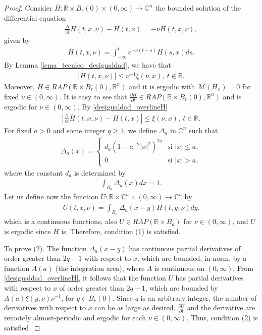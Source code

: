 \documentclass[10pt,a4paper]{amsart}
\newcommand{\bb}[1]{{\mathbb{#1}}}
\begin{document}
\begin{proof}
Consider $\overline{H}:\bb{R}\times B_{r}(0) \times (0,\infty)\rightarrow\bb{C}^n$ the bounded solution of the differential equation
\begin{eqnarray*}
\frac{\partial}{\partial t} \overline{H}(t,x,\nu)-H(t,x)=-\nu \overline{H}(t,x,\nu),
\end{eqnarray*}
given by
\begin{eqnarray*}
\overline{H}(t,x,\nu)=\int_{-\infty}^{t}e^{-\nu (t-s)}H(s,x)ds.
\end{eqnarray*}
By Lemma \ref{lema_tecnico_desigualdad}, we have that
\begin{eqnarray}
\vert \overline{H}(t,x,\nu) \vert\leq \nu^{-1}\xi(\nu,x),\ t\in\bb{R}. \label{desigualdad_overlineH}
\end{eqnarray}
Moreover, $\overline{H} \in RAP(\mathbb{R}\times B_{r}(0),\mathbb{R}^n)$ and it is ergodic with $\mathcal{M}(H_x)=0$ for fixed $\nu\in(0,\infty)$.  
It is easy to see that $\frac{\partial \overline{H}}{\partial t} \in RAP(\mathbb{R}\times B_{r}(0),\mathbb{R}^n)$ and is ergodic for $\nu\in (0,\infty)$.  
By \eqref{desigualdad_overlineH}
\begin{eqnarray*}
\left\vert \frac{\partial}{\partial t} \overline{H}(t,x,\nu)-H(t,x) \right\vert \leq \xi(\nu,x), \ t\in \bb{R}.
\end{eqnarray*}
For fixed $a>0$ and some integer $q\geq 1$, we define $\Delta_a$ in $\mathbb{C}^n$ such that
\begin{eqnarray*}
\Delta_{a}(x)=\begin{cases}
d_{a}(1-a^{-2}\left|x\right|^{2})^{2q} & \mbox{si }\left|x\right|\leq a,\\
0 & \mbox{si }\left|x\right|>a,
\end{cases}
\end{eqnarray*}
where the constant $d_a$ is determined by
\begin{eqnarray*}
\int_{B_{a}} \Delta_a (x)dx=1.
\end{eqnarray*}
Let us define now the function $U:\bb{R}\times\bb{C}^n\times(0,\infty)\rightarrow\bb{C}^n$ by
\begin{eqnarray*}
U(t,x,\nu)=\int_{B_{a}} \Delta_a(x-y)\overline{H}(t,y,\nu)dy.
\end{eqnarray*}
which is a continuous functions, also %
$U \in RAP(\mathbb{R}\times B_{a})$ for $\nu\in(0,\infty)$, and $U$ is ergodic since $\overline{H}$ is. Therefore, condition (1) is satisfied.

To prove (2). The function $\Delta_a(x - y)$ has continuous partial derivatives of order greater than $2q - 1$ with respect to $x$, which are bounded, in norm, by a function $A(a)$ (the integration area), where $A$ is continuous on $(0,\infty)$.  
From \eqref{desigualdad_overlineH}, it follows that the function $U$ has partial derivatives with respect to $x$ of order greater than $2q - 1$, which are bounded by $A(a)\xi(y,\nu)\nu^{-1}$, for $y\in B_r(0)$.  
Since $q$ is an arbitrary integer, the number of derivatives with respect to $x$ can be as large as desired.  
$\frac{\partial U}{\partial t}$ and the derivative are remotely almost-periodic and ergodic for each $\nu\in(0,\infty)$.  
Thus, condition (2) is satisfied.


\end{proof}
\end{document}
